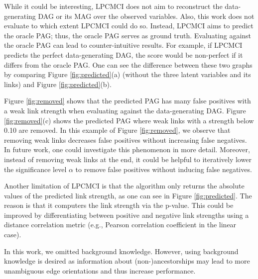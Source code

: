 \documentclass[conference]{IEEEtran}
\begin{document}
While it could be interesting, LPCMCI does not aim to reconstruct the data-generating DAG or its MAG over the observed variables. Also, this work does not evaluate to which extent LPCMCI could do so.
Instead, LPCMCI aims to predict the oracle PAG; thus, the oracle PAG serves as ground truth. Evaluating against the oracle PAG can lead to counter-intuitive results. For example, if LPCMCI predicts the perfect data-generating DAG, the score would be non-perfect if it differs from the oracle PAG. One can see the difference between these two graphs by comparing Figure \ref{fig:predicted}(a) (without the three latent variables and its links) and Figure \ref{fig:predicted}(b).

Figure \ref{fig:removed} shows that the predicted PAG has many false positives with a weak link strength when evaluating against the data-generating DAG. Figure \ref{fig:removed}(c) shows the predicted PAG where weak links with a strength below 0.10 are removed. In this example of Figure \ref{fig:removed}, we observe that removing weak links decreases false positives without increasing false negatives. In future work, one could investigate this phenomenon in more detail. Moreover, instead of removing weak links at the end, it could be helpful to iteratively lower the significance level $\alpha$ to remove false positives without inducing false negatives.

Another limitation of LPCMCI is that the algorithm only returns the absolute values of the predicted link strength, as one can see in Figure \ref{fig:predicted}. The reason is that it computers the link strength via the p-value. This could be improved by differentiating between positive and negative link strengths using a distance correlation metric (e.g., Pearson correlation coefficient in the linear case).

In this work, we omitted background knowledge. However, using background knowledge is desired as information about (non-)ancestorships may lead to more unambiguous edge orientations and thus increase performance.
\end{document}
